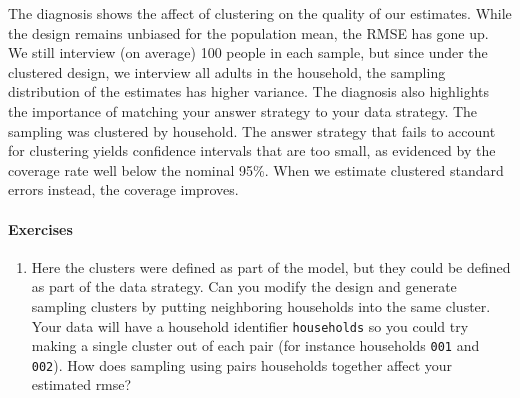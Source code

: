 \documentclass[
]{article}
\providecommand{\tightlist}{%
  \setlength{\itemsep}{0pt}\setlength{\parskip}{0pt}}
\begin{document}
The diagnosis shows the affect of clustering on the quality of our
estimates. While the design remains unbiased for the population mean,
the RMSE has gone up. We still interview (on average) 100 people in each
sample, but since under the clustered design, we interview all adults in
the household, the sampling distribution of the estimates has higher
variance. The diagnosis also highlights the importance of matching your
answer strategy to your data strategy. The sampling was clustered by
household. The answer strategy that fails to account for clustering
yields confidence intervals that are too small, as evidenced by the
coverage rate well below the nominal 95\%. When we estimate clustered
standard errors instead, the coverage improves.

\hypertarget{exercises-1}{%
\paragraph{Exercises}\label{exercises-1}}

\begin{enumerate}
\def\labelenumi{\arabic{enumi}.}
\tightlist
\item
  Here the clusters were defined as part of the model, but they could be
  defined as part of the data strategy. Can you modify the design and
  generate sampling clusters by putting neighboring households into the
  same cluster. Your data will have a household identifier
  \texttt{households} so you could try making a single cluster out of
  each pair (for instance households \texttt{001} and \texttt{002}). How
  does sampling using pairs households together affect your estimated
  rmse?
\end{enumerate}
\end{document}
